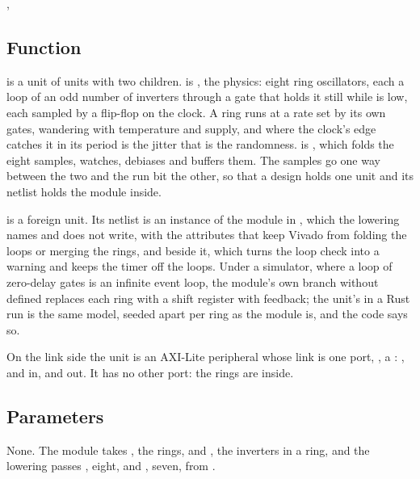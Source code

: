 
%
{, }

\subsection*{Function}

 is a unit of units with two children.  is
, the physics: eight ring oscillators, each a loop of an
odd number of inverters through a gate that holds it still while
 is low, each sampled by a flip-flop on the clock. A ring
runs at a rate set by its own gates, wandering with temperature and
supply, and where the clock's edge catches it in its period is the
jitter that is the randomness.  is , which folds
the eight samples, watches, debiases and buffers them. The samples go
one way between the two and the run bit the other, so that a design
holds one unit and its netlist holds the module inside.

 is a foreign unit. Its netlist is an instance of the
module  in , which
the lowering names and does not write, with the attributes that keep
Vivado from folding the loops or merging the rings, and
 beside it, which turns the loop check into a
warning and keeps the timer off the loops. Under a simulator, where a
loop of zero-delay gates is an infinite event loop, the module's own
branch without  defined replaces each ring with a
shift register with feedback; the unit's  in a Rust run is
the same model, seeded apart per ring as the module is, and the code
says so.

On the link side the unit is an AXI-Lite peripheral whose link is one
port, , a : , 
and  in,  and  out. It has no
other port: the rings are inside.

\subsection*{Parameters}

None. The module takes , the rings, and , the
inverters in a ring, and the lowering passes , eight, and
, seven, from .

